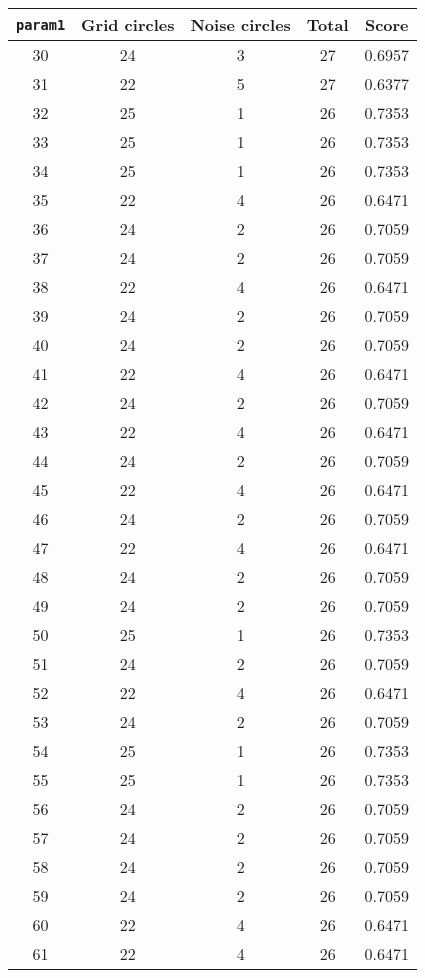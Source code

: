 \documentclass[letterpaper, 12pt]{article}
\begin{document}
\begin{longtable}{|c|c|c|c|c|}
\hline
\textbf{\texttt{param1}} & \textbf{Grid circles} & \textbf{Noise circles} & \textbf{Total} & \textbf{Score} \\
\hline
30 & 24 & 3 & 27 & 0.6957 \\
\hline
31 & 22 & 5 & 27 & 0.6377 \\
\hline
32 & 25 & 1 & 26 & 0.7353 \\
\hline
33 & 25 & 1 & 26 & 0.7353 \\
\hline
34 & 25 & 1 & 26 & 0.7353 \\
\hline
35 & 22 & 4 & 26 & 0.6471 \\
\hline
36 & 24 & 2 & 26 & 0.7059 \\
\hline
37 & 24 & 2 & 26 & 0.7059 \\
\hline
38 & 22 & 4 & 26 & 0.6471 \\
\hline
39 & 24 & 2 & 26 & 0.7059 \\
\hline
40 & 24 & 2 & 26 & 0.7059 \\
\hline
41 & 22 & 4 & 26 & 0.6471 \\
\hline
42 & 24 & 2 & 26 & 0.7059 \\
\hline
43 & 22 & 4 & 26 & 0.6471 \\
\hline
44 & 24 & 2 & 26 & 0.7059 \\
\hline
45 & 22 & 4 & 26 & 0.6471 \\
\hline
46 & 24 & 2 & 26 & 0.7059 \\
\hline
47 & 22 & 4 & 26 & 0.6471 \\
\hline
48 & 24 & 2 & 26 & 0.7059 \\
\hline
49 & 24 & 2 & 26 & 0.7059 \\
\hline
50 & 25 & 1 & 26 & 0.7353 \\
\hline
51 & 24 & 2 & 26 & 0.7059 \\
\hline
52 & 22 & 4 & 26 & 0.6471 \\
\hline
53 & 24 & 2 & 26 & 0.7059 \\
\hline
54 & 25 & 1 & 26 & 0.7353 \\
\hline
55 & 25 & 1 & 26 & 0.7353 \\
\hline
56 & 24 & 2 & 26 & 0.7059 \\
\hline
57 & 24 & 2 & 26 & 0.7059 \\
\hline
58 & 24 & 2 & 26 & 0.7059 \\
\hline
59 & 24 & 2 & 26 & 0.7059 \\
\hline
60 & 22 & 4 & 26 & 0.6471 \\
\hline
61 & 22 & 4 & 26 & 0.6471 \\

\end{longtable}
\end{document}
